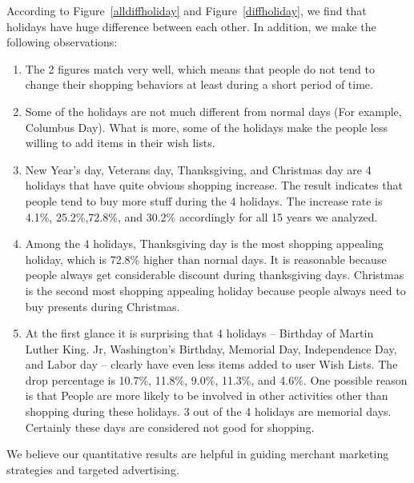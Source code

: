 According to Figure~\ref{alldiffholiday} and Figure~\ref{diffholiday}, we find that holidays have huge difference between each other. In addition, we make the following observations:
\begin{enumerate}
\item The 2 figures match very well, which means that people do not tend to change their shopping behaviors at least during a short period of time. 
\item Some of the holidays are not much different from normal days (For example, Columbus Day). What is more, some of the holidays make the people less willing to add items in their wish lists. 
\item New Year's day, Veterans day, Thanksgiving, and Christmas day are 4 holidays that have quite obvious shopping increase. The result indicates that people tend to buy more stuff during the 4 holidays. The increase rate is 4.1\%, 25.2\%,72.8\%, and 30.2\% accordingly for all 15 years we analyzed. 
\item Among the 4 holidays, Thanksgiving day is the most shopping appealing holiday, which is 72.8\% higher than normal days. It is reasonable because people always get considerable discount during thanksgiving days. Christmas is the second most shopping appealing holiday because people always need to buy presents during Christmas.
\item At the first glance it is surprising that 4 holidays -- Birthday of Martin Luther King. Jr, Washington's Birthday, Memorial Day, Independence Day, and Labor day -- clearly have even less items added to user Wish Lists. The drop percentage is 10.7\%, 11.8\%, 9.0\%, 11.3\%, and 4.6\%. One possible reason is that People are more likely to be involved in other activities other than shopping during these holidays. 3 out of the 4 holidays are memorial days. Certainly these days are considered not good for shopping. 
\end{enumerate}

We believe our quantitative results are helpful in guiding merchant marketing strategies and targeted advertising. 
